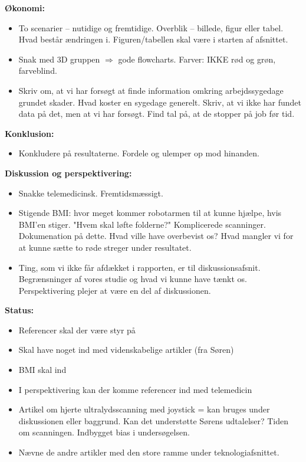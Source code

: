 \textbf{Økonomi:}
\begin{itemize}
\item To scenarier – nutidige og fremtidige. Overblik – billede, figur eller tabel. Hvad består ændringen i. Figuren/tabellen skal være i starten af afsnittet. 
\item Snak med 3D gruppen $\Rightarrow$ gode flowcharts. Farver: IKKE rød og grøn, farveblind. 
\item Skriv om, at vi har forsøgt at finde information omkring arbejdssygedage grundet skader. Hvad koster en sygedage generelt. Skriv, at vi ikke har fundet data på det, men at vi har forsøgt. Find tal på, at de stopper på job før tid.
\end{itemize}
\textbf{Konklusion:}
\begin{itemize}
\item Konkludere på resultaterne. Fordele og ulemper op mod hinanden. 
\end{itemize}
\textbf{Diskussion og perspektivering:}
\begin{itemize}
\item Snakke telemedicinsk. Fremtidsmæssigt. 
\item Stigende BMI: hvor meget kommer robotarmen til at kunne hjælpe, hvis BMI'en stiger. "Hvem skal løfte folderne?" Komplicerede scanninger. Dokumenation på dette. Hvad ville have overbevist os? Hvad mangler vi for at kunne sætte to røde streger under resultatet. 
\item Ting, som vi ikke får afdækket i rapporten, er til diskussionsafsnit. Begrænsninger af vores studie og hvad vi kunne have tænkt os. Perspektivering plejer at være en del af diskussionen. 
\end{itemize}
\textbf{Status:}
\begin{itemize}
\item Referencer skal der være styr på
\item Skal have noget ind med videnskabelige artikler (fra Søren)
\item BMI skal ind 
\item I perspektivering kan der komme referencer ind med telemedicin 
\item Artikel om hjerte ultralydsscanning med joystick = kan bruges under diskussionen eller baggrund. Kan det understøtte Sørens udtalelser? Tiden om scanningen. Indbygget bias i undersøgelsen. 
\item Nævne de andre artikler med den store ramme under teknologiafsnittet. 
\end{itemize}
\newpage


